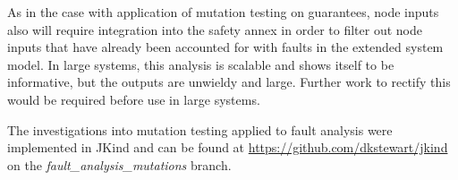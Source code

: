 As in the case with application of mutation testing on guarantees, node inputs also will require integration into the safety annex in order to filter out node inputs that have already been accounted for with faults in the extended system model. In large systems, this analysis is scalable and shows itself to be informative, but the outputs are unwieldy and large. Further work to rectify this would be required before use in large systems. 

The investigations into mutation testing applied to fault analysis were implemented in JKind and can be found at \url{https://github.com/dkstewart/jkind} on the {\em fault\_analysis\_mutations} branch.
